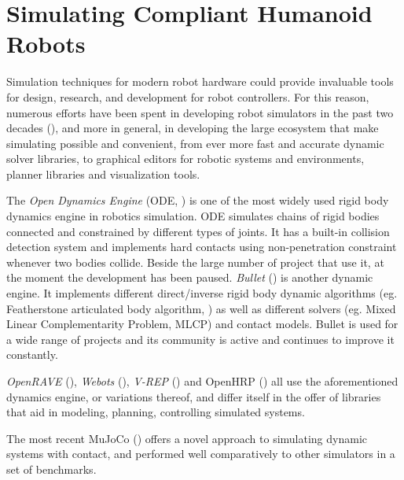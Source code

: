\section{Simulating Compliant Humanoid Robots}
Simulation techniques for modern robot hardware could provide invaluable tools for design, research, and development for robot controllers.
For this reason, numerous efforts have been spent in developing robot simulators in the past two decades (\cite{DBLP:journals/corr/IvaldiPN14}), and more in general, in developing the large ecosystem that make simulating possible and convenient, from ever more fast and accurate dynamic solver libraries, to graphical editors for robotic systems and environments, planner libraries and visualization tools.

The \emph{Open Dynamics Engine} (ODE, \cite{opende}) is one of the most widely used rigid body dynamics engine in robotics simulation. ODE simulates chains of rigid bodies connected and constrained by different types of joints. It has a built-in collision detection system and implements hard contacts using non-penetration constraint whenever two bodies collide. Beside the large number of project that use it, at the moment the development has been paused. \emph{Bullet} (\cite{bulletpe}) is another dynamic engine. It implements different direct/inverse rigid body dynamic algorithms (eg. Featherstone articulated body algorithm, \cite{Featherstone:2007:RBD:1324846}) as well as different solvers (eg. Mixed Linear Complementarity Problem, MLCP) and contact models. Bullet is used for a wide range of projects and its community is active and continues to improve it constantly.

\emph{OpenRAVE} (\cite{diankovthesis}), \emph{Webots}  (\cite{Michel04cyberboticsltd}), \emph{V-REP} (\cite{conf/iros/RohmerSF13}) and OpenHRP  (\cite{journals/ijrr/KanehiroHK04}) all use the aforementioned dynamics engine, or variations thereof, and differ itself in the offer of libraries that aid in modeling, planning, controlling simulated systems.

The most recent MuJoCo (\cite{conf/iros/TodorovET12}) offers a novel approach to simulating dynamic systems with contact, and performed well comparatively to other simulators in a set of benchmarks\cite{erez15}.

